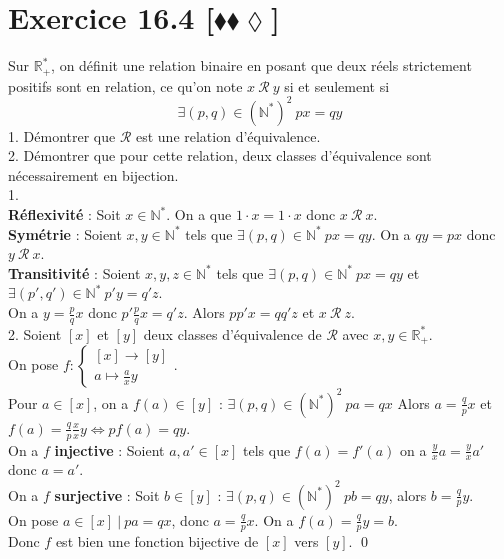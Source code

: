 \documentclass[10pt]{article}
\begin{document}
\section*{Exercice 16.4 [$\blacklozenge\blacklozenge\lozenge$]}
\begin{tcolorbox}[enhanced, width=7.6in, center, size=fbox, fontupper=\large, drop shadow southwest]
    Sur $\mathbb{R}^*_+$, on définit une relation binaire en posant que deux réels strictement positifs sont en relation, ce qu'on note $x~\mathcal{R}~y$ si et seulement si
    \begin{equation*}
        \exists(p,q)\in(\mathbb{N}^*)^2 ~ px = qy
    \end{equation*}
    1. Démontrer que $\mathcal{R}$ est une relation d'équivalence.\\
    2. Démontrer que pour cette relation, deux classes d'équivalence sont nécessairement en bijection.\\[0.2cm]
    1.\\
    \textbf{Réflexivité} : Soit $x\in\mathbb{N}^*$. On a que $1\cdot x = 1\cdot x$ donc $x ~ \mathcal{R} ~ x$.\\
    \textbf{Symétrie} : Soient $x,y\in\mathbb{N}^*$ tels que $\exists(p,q)\in\mathbb{N}^* ~ px = qy$. On a $qy = px$ donc $y ~ \mathcal{R} ~ x$.\\
    \textbf{Transitivité} : Soient $x,y,z\in\mathbb{N}^*$ tels que $\exists(p,q)\in\mathbb{N}^*~px=qy$ et $\exists(p',q')\in\mathbb{N}^*~p'y=q'z$.\\
    On a $y=\frac{p}{q}x$ donc $p'\frac{p}{q}x=q'z$. Alors $pp'x=qq'z$ et $x~\mathcal{R}~z$.\\[0.15cm]
    2. Soient $[x]$ et $[y]$ deux classes d'équivalence de $\mathcal{R}$ avec $x,y\in\mathbb{R}^*_+$.\\
    On pose $f:\begin{cases}
        [x] \to [y]\\
        a\mapsto \frac{a}{x}y
    \end{cases}$.\\
    Pour $a\in[x]$, on a $f(a)\in[y]$ : $\exists (p,q)\in(\mathbb{N}^*)^2 ~ pa = qx$ Alors $a=\frac{q}{p}x$ et $f(a)=\frac{q}{p}\frac{x}{x}y \iff pf(a)=qy$.\\
    On a $f$ \textbf{injective} : Soient $a,a'\in[x]$ tels que $f(a)=f'(a)$ on a $\frac{y}{x}a=\frac{y}{x}a'$ donc $a=a'$.\\
    On a $f$ \textbf{surjective} : Soit $b\in[y]$ : $\exists(p,q)\in(\mathbb{N}^*)^2 ~ pb = qy$, alors $b=\frac{q}{p}y$.\\
    On pose $a\in[x] ~ | ~ pa=qx$, donc $a=\frac{q}{p}x$. On a $f(a)=\frac{q}{p}y=b$.\\
    Donc $f$ est bien une fonction bijective de $[x]$ vers $[y]$.
    \qed
\end{tcolorbox}
\end{document}
